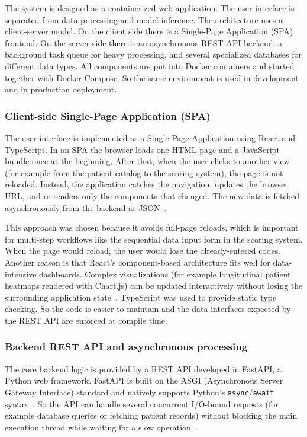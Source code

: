 The system is designed as a containerized web application. The user interface is separated from data processing and model inference. The architecture uses a client-server model. On the client side there is a Single-Page Application (SPA) frontend. On the server side there is an asynchronous REST API backend, a background task queue for heavy processing, and several specialized databases for different data types. All components are put into Docker containers and started together with Docker Compose. So the same environment is used in development and in production deployment.

\subsubsection{Client-side Single-Page Application (SPA)}
The user interface is implemented as a Single-Page Application using React and TypeScript. In an SPA the browser loads one HTML page and a JavaScript bundle once at the beginning. After that, when the user clicks to another view (for example from the patient catalog to the scoring system), the page is not reloaded. Instead, the application catches the navigation, updates the browser URL, and re-renders only the components that changed. The new data is fetched asynchronously from the backend as JSON~\cite{spa_benefits_digiteum}.

This approach was chosen because it avoids full-page reloads, which is important for multi-step workflows like the sequential data input form in the scoring system. When the page would reload, the user would lose the already-entered codes. Another reason is that React's component-based architecture fits well for data-intensive dashboards. Complex visualizations (for example longitudinal patient heatmaps rendered with Chart.js) can be updated interactively without losing the surrounding application state~\cite{react_data_viz_2025}. TypeScript was used to provide static type checking. So the code is easier to maintain and the data interfaces expected by the REST API are enforced at compile time.

\subsubsection{Backend REST API and asynchronous processing}
The core backend logic is provided by a REST API developed in FastAPI, a Python web framework. FastAPI is built on the ASGI (Asynchronous Server Gateway Interface) standard and natively supports Python's \texttt{async}/\texttt{await} syntax~\cite{fastapi_ml_advantages}. So the API can handle several concurrent I/O-bound requests (for example database queries or fetching patient records) without blocking the main execution thread while waiting for a slow operation~\cite{fastapi_ml_advantages}.

